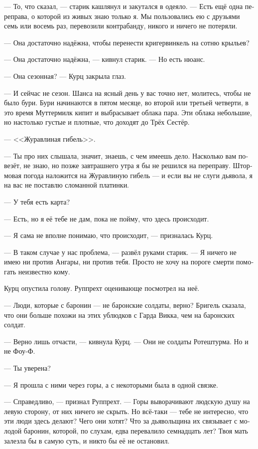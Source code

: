 \documentclass[a4paper,12pt,fleqn]{book}\usepackage{cooltooltips}\usepackage{polyglossia}\setdefaultlanguage[babelshorthands=true]{russian}\setotherlanguage{english}\defaultfontfeatures{Ligatures=TeX,Mapping=tex-text} \usepackage{xcolor}\definecolor{lightgray}{HTML}{bbbbbb}\color{lightgray}\newcommand{\ml}[3]{\textenglish{\textcolor{black}{#3}}}
\begin{document}
--- То, что сказал, --- старик кашлянул и закутался в одеяло.
--- Есть ещё одна переправа, о которой из живых знаю только я.
Мы пользовались ею с друзьями семь или восемь раз, перевозили контрабанду, никого и ничего не потеряли.

--- Она достаточно надёжна, чтобы перенести кригервинкель на сотню крыльев?

--- Она достаточно надёжна, --- кивнул старик.
--- Но есть нюанс.

--- Она сезонная? --- Курц закрыла глаз.

--- И сейчас не сезон.
Шанса на ясный день у вас точно нет, молитесь, чтобы не было бури.
Бури начинаются в пятом месяце, во второй или третьей четверти, в это время Муттермилк кипит и выбрасывает облака пара.
Эти облака небольшие, но настолько густые и плотные, что доходят до Трёх Сестёр.

--- <<Журавлиная гибель>>.

--- Ты про них слышала, значит, знаешь, с чем имеешь дело.
Насколько вам повезёт, не знаю, но позже завтрашнего утра я бы не решился на переправу.
Штормовая погода наложится на Журавлиную гибель --- и если вы не слуги дьявола, я на вас не поставлю сломанной платинки.

--- У тебя есть карта?

--- Есть, но я её тебе не дам, пока не пойму, что здесь происходит.

--- Я сама не вполне понимаю, что происходит, --- призналась Курц.

--- В таком случае у нас проблема, --- развёл руками старик.
--- Я ничего не имею ни против Ангары, ни против тебя.
Просто не хочу на пороге смерти помогать неизвестно кому.

Курц опустила голову.
Руппрехт оценивающе посмотрел на неё.

--- Люди, которые с баронин --- не баронские солдаты, верно?
Бригель сказала, что они больше похожи на этих ублюдков с Гарда Викка, чем на баронских солдат.

--- Верно лишь отчасти, --- кивнула Курц.
--- Они не солдаты Ротештурма.
Но и не Фоу-Ф.

--- Ты уверена?

--- Я прошла с ними через горы, а с некоторыми была в одной связке.

--- Справедливо, --- признал Руппрехт.
--- Горы выворачивают людскую душу на левую сторону, от них ничего не скрыть.
Но всё-таки --- тебе не интересно, что эти люди здесь делают?
Чего они хотят?
Что за дьявольщина их связывает с молодой баронин, которой, по слухам, едва перевалило семнадцать лет?
Твоя мать залезла бы в самую суть, и никто бы её не остановил.
\end{document}
